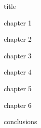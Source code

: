 \documentclass{mathreport}
\begin{document}
{title}

\tableofcontents

\newpage
{chapter 1}

\newpage
{chapter 2}

\newpage
{chapter 3}

\newpage
{chapter 4}

\newpage
{chapter 5}

\newpage
{chapter 6}

\newpage
{conclusions}

\newpage
\printbibliography[title={Перелік посилань}] %
\end{document}
